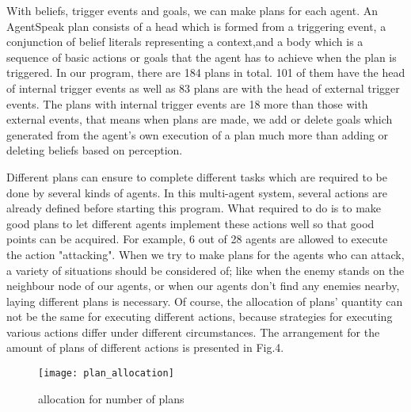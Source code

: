 \documentclass{llncs}
\begin{document}
With beliefs, trigger events and goals, we can make plans for each agent. An AgentSpeak plan consists of a head which is formed from a triggering event, a conjunction of belief literals representing a context,and a body which is a sequence of basic actions or goals that the agent has to achieve when the plan is triggered\cite{rafael_BDIAgent_2005}. In our program, there are 184 plans in total. 101 of them have the head of internal trigger events as well as 83 plans are with the head of external trigger events. The plans with internal trigger events are 18 more than those with external events, that means when plans are made, we add or delete goals which generated from the agent’s own execution of a plan much more than adding or deleting beliefs based on perception. 

Different plans can ensure to complete different tasks which are required to be done by several kinds of agents. In this multi-agent system, several actions are already defined before starting this program. What required to do is to make good plans to let different agents implement these actions well so that good points can be acquired. For example, 6 out of 28 agents are allowed to execute the action "attacking". When we try to make plans for the agents who can attack, a variety of situations should be considered of; like when the enemy stands on the neighbour node of our agents, or when our agents don't find any enemies nearby, laying different plans is necessary. Of course, the allocation of plans' quantity can not be the same for executing different actions, because strategies for executing various actions differ under different circumstances. The arrangement for the amount of plans of different actions is presented in Fig.4.
\begin{figure}[H]
\centering
\begin{minipage}[!htbp]{\linewidth}
\texttt{[image: plan\_allocation]}
\caption{allocation for number of plans}
\label{fig:plan_allocation}
\end{minipage}
\end{figure}
\end{document}
